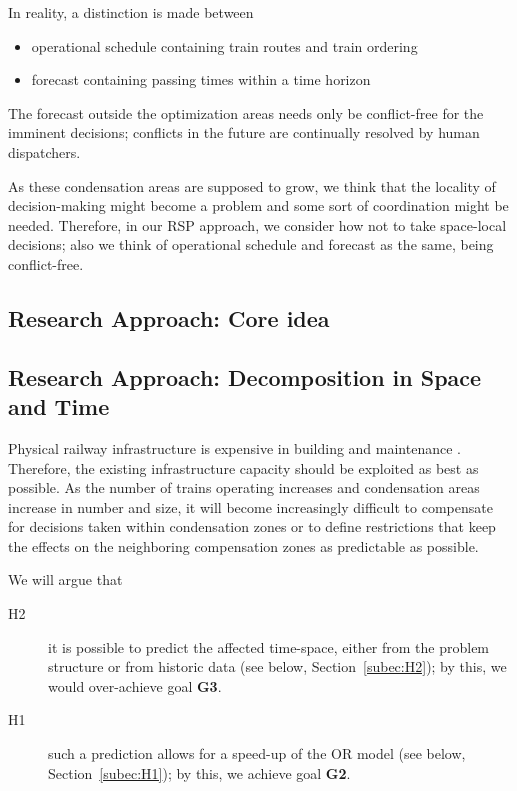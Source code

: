 \documentclass{article}
\begin{document}
In reality, a distinction is made between
\begin{itemize}
    \item operational schedule containing train routes and train ordering
    \item forecast containing passing times within a time horizon
\end{itemize}
%
The forecast outside the optimization areas needs only be conflict-free for the imminent decisions; conflicts in the future are continually resolved by human dispatchers.

As these condensation areas are supposed to grow, we think that the locality of decision-making might become a problem and some sort of coordination might be needed.
%
Therefore, in our RSP approach, we consider how not to take space-local decisions; also we think of operational schedule and forecast as the same, being conflict-free.

\subsection{Research Approach: Core idea}


\subsection{Research Approach: Decomposition in Space and Time}
Physical railway infrastructure is expensive in building and maintenance \cite{sr40programm}.
Therefore, the existing infrastructure capacity should be exploited as best as possible.
As the number of trains operating increases and condensation areas increase in number and size, it will become increasingly difficult to compensate for decisions taken within condensation zones or to define restrictions that keep the effects on the neighboring compensation zones as predictable as possible.

We will argue that
\begin{description}
\item [H2] it is possible to predict the affected time-space, either from the problem structure or from historic data (see below, Section~\ref{subec:H2}); by this, we would over-achieve goal \textbf{G3}.
\item [H1] such a prediction allows for a speed-up of the OR model (see below, Section~\ref{subec:H1}); by this, we achieve goal \textbf{G2}.
\end{description}
\end{document}
